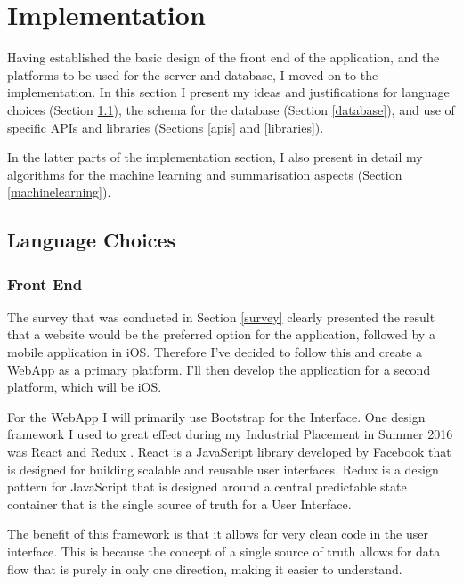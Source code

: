 \documentclass[12pt]{article}
\begin{document}

\newpage

\section{Implementation}

Having established the basic design of the front end of the application, and the platforms to be used for the server and database, I moved on to the implementation. In this section I present my ideas and justifications for language choices (Section \ref{languagechoice}), the schema for the database (Section \ref{database}), and use of specific APIs and libraries (Sections \ref{apis} and \ref{libraries}).

In the latter parts of the implementation section, I also present in detail my algorithms for the machine learning and summarisation aspects (Section \ref{machinelearning}).  

\subsection{Language Choices}

\label{languagechoice}

\subsubsection{Front End}

The survey that was conducted in Section \ref{survey} clearly presented the result that a website would be the preferred option for the application, followed by a mobile application in iOS. Therefore I've decided to follow this and create a WebApp as a primary platform. I'll then develop the application for a second platform, which will be iOS.

For the WebApp I will primarily use Bootstrap \cite{bootstrap} for the Interface. One design framework I used to great effect during my Industrial Placement in Summer 2016 was React \cite{react} and Redux \cite{redux}. React is a JavaScript library developed by Facebook \cite{facebook} that is designed for building scalable and reusable user interfaces. Redux is a design pattern for JavaScript that is designed around a central predictable state container that is the single source of truth for a User Interface. 

The benefit of this framework is that it allows for very clean code in the user interface. This is because the concept of a single source of truth allows for data flow that is purely in only one direction, making it easier to understand.
\end{document}
